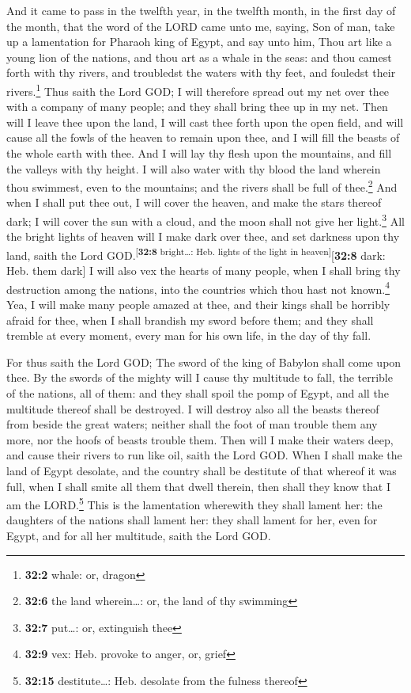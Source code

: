  And it came to pass in the twelfth year, in the twelfth
month, in the first day of the month, that the word of the LORD came
unto me, saying,  Son of man, take up a lamentation for
Pharaoh king of Egypt, and say unto him, Thou art like a young lion of
the nations, and thou art as a whale in the seas: and thou camest forth
with thy rivers, and troubledst the waters with thy feet, and fouledst
their rivers.\footnote{\textbf{32:2} whale: or, dragon} 
Thus saith the Lord GOD; I will therefore spread out my net over thee
with a company of many people; and they shall bring thee up in my net.
 Then will I leave thee upon the land, I will cast thee
forth upon the open field, and will cause all the fowls of the heaven to
remain upon thee, and I will fill the beasts of the whole earth with
thee.  And I will lay thy flesh upon the mountains, and
fill the valleys with thy height.  I will also water with
thy blood the land wherein thou swimmest, even to the mountains; and the
rivers shall be full of thee.\footnote{\textbf{32:6} the land
  wherein\ldots: or, the land of thy swimming}  And when I
shall put thee out, I will cover the heaven, and make the stars thereof
dark; I will cover the sun with a cloud, and the moon shall not give her
light.\footnote{\textbf{32:7} put\ldots: or, extinguish thee}
 All the bright lights of heaven will I make dark over
thee, and set darkness upon thy land, saith the Lord
GOD.\textsuperscript{{[}\textbf{32:8} bright\ldots: Heb. lights of the
light in heaven{]}}{[}\textbf{32:8} dark: Heb. them dark{]}
 I will also vex the hearts of many people, when I shall
bring thy destruction among the nations, into the countries which thou
hast not known.\footnote{\textbf{32:9} vex: Heb. provoke to anger, or,
  grief}  Yea, I will make many people amazed at thee,
and their kings shall be horribly afraid for thee, when I shall brandish
my sword before them; and they shall tremble at every moment, every man
for his own life, in the day of thy fall.

 For thus saith the Lord GOD; The sword of the king of
Babylon shall come upon thee.  By the swords of the
mighty will I cause thy multitude to fall, the terrible of the nations,
all of them: and they shall spoil the pomp of Egypt, and all the
multitude thereof shall be destroyed.  I will destroy
also all the beasts thereof from beside the great waters; neither shall
the foot of man trouble them any more, nor the hoofs of beasts trouble
them.  Then will I make their waters deep, and cause
their rivers to run like oil, saith the Lord GOD.  When I
shall make the land of Egypt desolate, and the country shall be
destitute of that whereof it was full, when I shall smite all them that
dwell therein, then shall they know that I am the LORD.\footnote{\textbf{32:15}
  destitute\ldots: Heb. desolate from the fulness thereof}
 This is the lamentation wherewith they shall lament her:
the daughters of the nations shall lament her: they shall lament for
her, even for Egypt, and for all her multitude, saith the Lord GOD.

